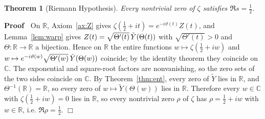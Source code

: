 \documentclass{article}
\newenvironment{proof}{\noindent\textbf{Proof\ }}{\hspace*{\fill}$\Box$\medskip}
\newtheorem{theorem}{Theorem}
\newcommand{\R}{\mathbb{R}}
\newcommand{\C}{\mathbb{C}}
\begin{document}
\begin{theorem}
  [Riemann Hypothesis]\label{thm:RH} Every nontrivial zero of $\zeta$
  satisfies $\Re s = \tfrac{1}{2}$.
\end{theorem}

\begin{proof}
  On $\R$, Axiom~\ref{ax:Z} gives $\zeta (\tfrac{1}{2} + it) = e^{- i
  \vartheta (t)} Z (t)$, and Lemma~\ref{lem:warp} gives $Z (t) = \sqrt{\Theta'
  (t)}  \hspace{0.17em} \tilde{Y} (\Theta (t))$ with $\sqrt{\Theta' (t)} > 0$
  and $\Theta : \R \to \R$ a bijection. Hence on $\R$ the entire functions $w
  \mapsto \zeta (\tfrac{1}{2} + iw)$ and $w \mapsto e^{- i \vartheta (w)} 
  \sqrt{\Theta' (w)}  \hspace{0.17em} \tilde{Y} (\Theta (w))$ coincide; by the
  identity theorem they coincide on $\C$. The exponential and square-root
  factors are nonvanishing, so the zero sets of the two sides coincide on
  $\C$. By Theorem~\ref{thm:ent}, every zero of $\tilde{Y}$ lies in $\R$, and
  $\Theta^{- 1} (\R) = \R$, so every zero of $w \mapsto \tilde{Y} (\Theta
  (w))$ lies in $\R$. Therefore every $w \in \C$ with $\zeta (\tfrac{1}{2} +
  iw) = 0$ lies in $\R$, so every nontrivial zero $\rho$ of $\zeta$ has $\rho
  = \tfrac{1}{2} + iw$ with $w \in \R$, i.e. $\Re \rho = \tfrac{1}{2}$.
\end{proof}
\end{document}
